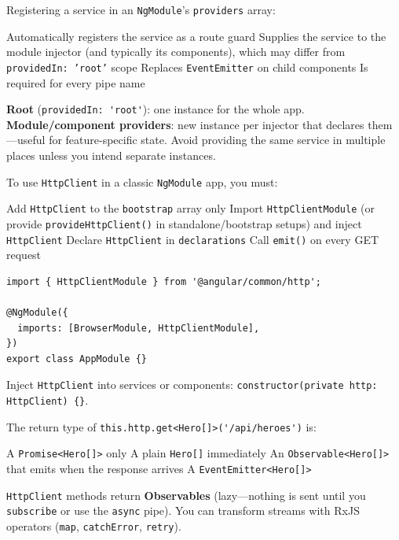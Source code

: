 \question[4]
Registering a service in an \texttt{NgModule}'s \texttt{providers} array:
\begin{choices}
  \choice Automatically registers the service as a route guard
  \CorrectChoice Supplies the service to the module injector (and typically its components), which may differ from \texttt{providedIn: 'root'} scope
  \choice Replaces \lstinline[style=tsinline]|EventEmitter| on child components
  \choice Is required for every pipe name
\end{choices}
\begin{solution}
  \textbf{Root} (\lstinline[style=tsinline]|providedIn: 'root'|): one instance for the whole app. \textbf{Module/component providers}: new instance per injector that declares them---useful for feature-specific state. Avoid providing the same service in multiple places unless you intend separate instances.
\end{solution}

\question[4]
To use \texttt{HttpClient} in a classic \texttt{NgModule} app, you must:
\begin{choices}
  \choice Add \texttt{HttpClient} to the \texttt{bootstrap} array only
  \CorrectChoice Import \lstinline[style=tsinline]|HttpClientModule| (or provide \lstinline[style=tsinline]|provideHttpClient()| in standalone/bootstrap setups) and inject \lstinline[style=tsinline]|HttpClient|
  \choice Declare \texttt{HttpClient} in \texttt{declarations}
  \choice Call \lstinline[style=tsinline]|emit()| on every GET request
\end{choices}
\begin{solution}
\begin{lstlisting}[style=ts]
import { HttpClientModule } from '@angular/common/http';

@NgModule({
  imports: [BrowserModule, HttpClientModule],
})
export class AppModule {}
\end{lstlisting}
  Inject \lstinline[style=tsinline]|HttpClient| into services or components: \lstinline[style=tsinline]|constructor(private http: HttpClient) {}|.
\end{solution}

\question[4]
The return type of \lstinline[style=tsinline]|this.http.get<Hero[]>('/api/heroes')| is:
\begin{choices}
  \choice A \texttt{Promise<Hero[]>} only
  \choice A plain \texttt{Hero[]} immediately
  \CorrectChoice An \lstinline[style=tsinline]|Observable<Hero[]>| that emits when the response arrives
  \choice A \lstinline[style=tsinline]|EventEmitter<Hero[]>|
\end{choices}
\begin{solution}
  \texttt{HttpClient} methods return \textbf{Observables} (lazy---nothing is sent until you \texttt{subscribe} or use the \lstinline[style=htmlinline]|async| pipe). You can transform streams with RxJS operators (\lstinline[style=tsinline]|map|, \lstinline[style=tsinline]|catchError|, \lstinline[style=tsinline]|retry|).
\end{solution}

